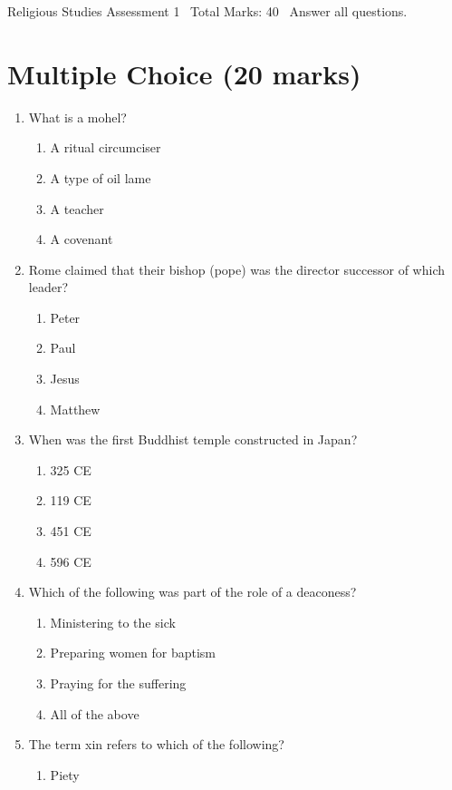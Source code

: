 \documentclass[12pt]{article}
\begin{document}
\begin{center}
Religious Studies Assessment 1 \
Total Marks: 40 \
Answer all questions.
\end{center}

\section*{Multiple Choice (20 marks)}
\begin{enumerate}[label=\arabic*.]
\item What is a mohel?
\begin{enumerate}[label=(\alph*)]
    \item A ritual circumciser
    \item A type of oil lame
    \item A teacher
    \item A covenant
\end{enumerate}
\item Rome claimed that their bishop (pope) was the director successor of which leader?
\begin{enumerate}[label=(\alph*)]
    \item Peter
    \item Paul
    \item Jesus
    \item Matthew
\end{enumerate}
\item When was the first Buddhist temple constructed in Japan?
\begin{enumerate}[label=(\alph*)]
    \item 325 CE
    \item 119 CE
    \item 451 CE
    \item 596 CE
\end{enumerate}
\item Which of the following was part of the role of a deaconess?
\begin{enumerate}[label=(\alph*)]
    \item Ministering to the sick
    \item Preparing women for baptism
    \item Praying for the suffering
    \item All of the above
\end{enumerate}
\item The term xin refers to which of the following?
\begin{enumerate}[label=(\alph*)]
    \item Piety

\end{enumerate}
\end{enumerate}
\end{document}
